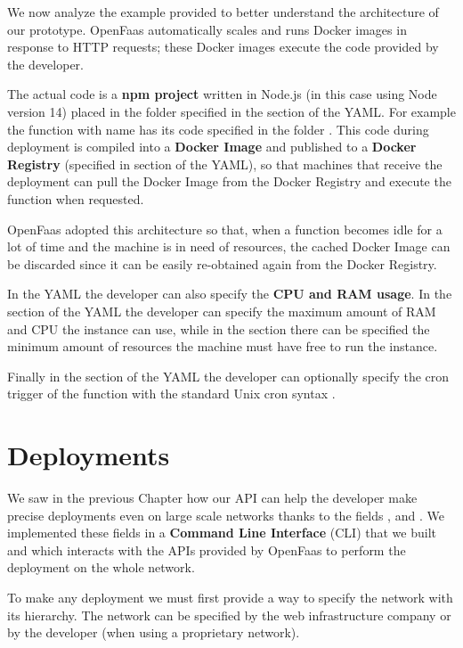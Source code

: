 We now analyze the example provided to better understand the architecture of our prototype. OpenFaas automatically scales and runs Docker images in response to HTTP requests; these Docker images execute the code provided by the developer.

The actual code is a \textbf{npm project} written in Node.js (in this case using Node version 14) placed in the folder specified in the  section of the YAML. For example the function with name  has its code specified in the folder .
This code during deployment is compiled into a \textbf{Docker Image} and published to a \textbf{Docker Registry} (specified in  section of the YAML), so that machines that receive the deployment can pull the Docker Image from the Docker Registry and execute the function when requested.

OpenFaas adopted this architecture so that, when a function becomes idle for a lot of time and the machine is in need of resources, the cached Docker Image can be discarded since it can be easily re-obtained again from the Docker Registry.

In the YAML the developer can also specify the \textbf{CPU and RAM usage}. In the  section of the YAML the developer can specify the maximum amount of RAM and CPU the instance can use, while in the  section there can be specified the minimum amount of resources the machine must have free to run the instance.

Finally in the  section of the YAML the developer can optionally specify the cron trigger of the function with the standard Unix cron syntax \cite{cron-syntax}.


\section{Deployments}
We saw in the previous Chapter how our API can help the developer make precise deployments even on large scale networks thanks to the fields ,  and . We implemented these fields in a \textbf{Command Line Interface} (CLI) that we built and which interacts with the APIs provided by OpenFaas to perform the deployment on the whole network.

To make any deployment we must first provide a way to specify the network with its hierarchy. The network can be specified by the web infrastructure company or by the developer (when using a proprietary network).


